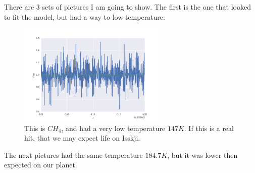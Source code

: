 \documentclass[a4paper, 10pt]{article}
\begin{document}
There are 3 sets of pictures I am going to show. The first is the one that looked to fit the model, but had a way to low temperature:

\begin{figure}[H]
\centering
\includegraphics[width = 70mm]{part6wrongTemp2200.png}
\caption{This is $CH_4$, and had a very low temperature $147 K$. If this is a real hit, that we may expect life on Isskji.}
\end{figure}


The next pictures had the same temperature $184.7 K$, but it was lower then expected on our planet.
\end{document}

